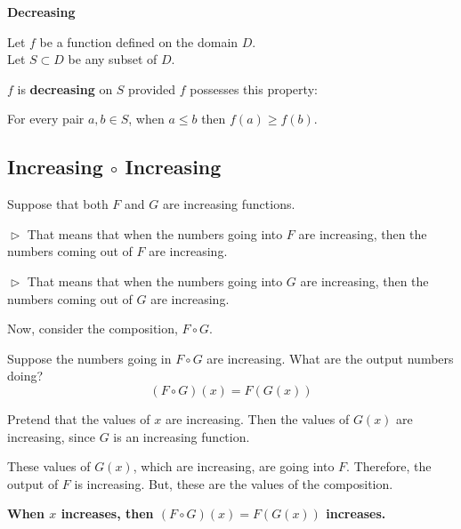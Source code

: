 \documentclass{ximera}
\begin{document}
\begin{idea} \textbf{\textcolor{blue!55!black}{Decreasing}} 


Let $f$ be a function defined on the domain $D$. \\
Let $S \subset D$ be any subset of $D$.

$f$ is \textbf{decreasing} on $S$ provided $f$ possesses this property:  


\begin{center}
For every pair $a, b \in S$, when $a \leq b$ then $f(a) \geq f(b)$.
\end{center}

\end{idea}











\subsection*{Increasing $\circ$ Increasing}


Suppose that both $F$ and $G$ are increasing functions. 

$\vartriangleright$ That means that when the numbers going into $F$ are increasing, then the numbers coming out of $F$ are increasing. 

$\vartriangleright$ That means that when the numbers going into $G$ are increasing, then the numbers coming out of $G$ are increasing. 



Now, consider the composition, $F \circ G$. 


Suppose the numbers going in $F \circ G$ are increasing.  What are the output numbers doing? \\




\[ (F \circ G)(x) = F(G(x)) \]


Pretend that the values of $x$ are increasing. Then the values of $G(x)$ are increasing, since $G$ is an increasing function.

These values of $G(x)$, which are increasing, are going into $F$.  Therefore, the output of $F$ is increasing.  But, these are the values of the composition.



\begin{center}
\textbf{\textcolor{red!70!black}{When $x$ increases, then $(F \circ G)(x) = F(G(x))$ increases.}}
\end{center}
\end{document}
